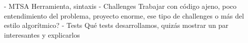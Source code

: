 - MTSA
    Herramienta, sintaxis
- Challenges 
    Trabajar con código ajeno, poco entendimiento del problema, proyecto enorme, ese tipo de challenges o más del estilo algorítmico? 
- Tests 
    Qué tests desarrollamos, quizás mostrar un par interesantes y explicarlos
